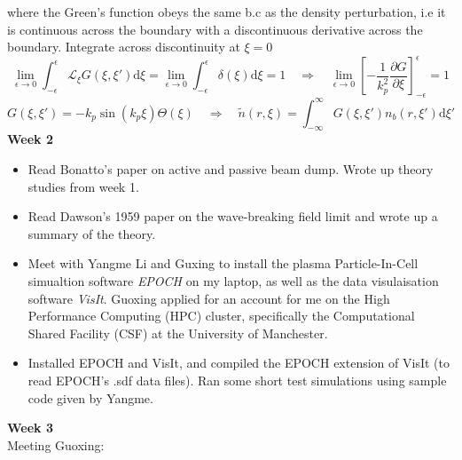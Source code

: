 \documentclass[%
onecolumn, notitlepage,
 amsmath,amssymb,
 aps,
]{article}
\begin{document}
where the Green's function obeys the same b.c as the density perturbation, i.e it is continuous across the boundary with a discontinuous derivative across the boundary.
Integrate across discontinuity at $\xi=0$
\begin{equation}
\lim_{\epsilon\to 0}\int_{-\epsilon}^{\epsilon} \mathcal{L}_{\xi}G\left(\xi,\xi'\right)\mathrm{d}\xi=\lim_{\epsilon\to 0}\int_{-\epsilon}^{\epsilon}\delta\left(\xi\right)\mathrm{d}\xi=1 \quad \Rightarrow \quad \lim_{\epsilon\to 0}\left[-\frac{1}{k_p^2}\frac{\partial G}{\partial \xi}\right]^{\epsilon}_{-\epsilon}=1
\end{equation}
\begin{equation}
G\left(\xi,\xi'\right)=-k_p\sin\left(k_p\xi \right)\Theta\left(\xi \right) \quad \Rightarrow \quad \tilde{n}\left(r,\xi \right)=\int_{-\infty}^{\infty}G\left(\xi,\xi'\right)n_b\left(r,\xi' \right) \mathrm{d}\xi'
\end{equation}
\noindent \textbf{Week 2}\\
\begin{itemize}
\item[\textcolor{MancPurple}{\textbullet}] Read Bonatto's paper on active and passive beam dump. Wrote up theory studies from week 1. 
\item[\textcolor{MancPurple}{\textbullet}]Read Dawson's 1959 paper on the wave-breaking field limit and wrote up a summary of the theory.
\item[\textcolor{MancPurple}{\textbullet}] Meet with Yangme Li and Guxing to install the plasma Particle-In-Cell simualtion software \textit{EPOCH} on my laptop, as well as the data visulaisation software \textit{VisIt}. Guoxing applied for an account for me on the High Performance Computing (HPC) cluster, specifically the Computational Shared Facility (CSF) at the University of Manchester.
\item[\textcolor{MancPurple}{\textbullet}] Installed EPOCH and VisIt, and compiled the EPOCH extension of VisIt (to read EPOCH's .sdf data files). Ran some short test simulations using sample code given by Yangme. 
\end{itemize}
\noindent \textbf{Week 3}\\
Meeting Guoxing:
\end{document}
